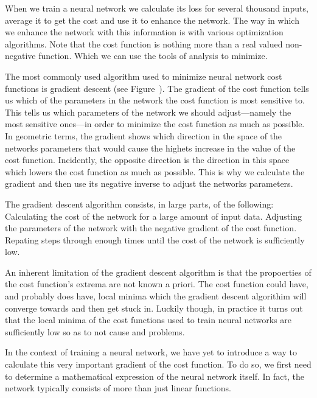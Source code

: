When we train a neural network we calculate its loss for several thousand inputs, average it to get the cost and use it to enhance the network.
The way in which we enhance the network with this information is with various optimization algorithms.
Note that the cost function is nothing more than a real valued non-negative function.
Which we can use the tools of analysis to minimize.

The most commonly used algorithm used to minimize neural network cost functions is gradient descent (see Figure~\in[gradient]).
The gradient of the cost function tells us which of the parameters in the network the cost function is most sensitive to.
This tells us which parameters of the network we should adjust---namely the most sensitive ones---in order to minimize the cost function as much as possible.
In geometric terms, the gradient shows which direction in the space of the networks parameters that would cause the highets increase in the value of the cost function.
Incidently, the opposite direction is the direction in this space which lowers the cost function as much as possible.
This is why we calculate the gradient and then use its negative inverse to adjust the networks parameters. 

The gradient descent algorithm consists, in large parts, of the following:
\startitemize[n]
\startitem[step1]
    Calculating the cost of the network for a large amount of input data.
\stopitem
\startitem[step2]
    Adjusting the parameters of the network with the negative gradient of the cost function.
\stopitem
\startitem
    Repating steps \in[step1] through \in[step2] enough times until the cost of the network is sufficiently low. 
\stopitem
\stopitemize

An inherent limitation of the gradient descent algorithm is that the propoerties of the cost function's extrema are not known a priori.
The cost function could have, and probably does have, local minima which the gradient descent algorithim will converge towards and then get stuck in.
Luckily though, in practice it turns out that the local minima of the cost functions used to train neural networks are sufficiently low so as to not cause and problems.

\startplacefigure[
    reference=gradient,
    location=bottom,
    title={Visualization of gradient descent \cite[s_2019].},
]
\stopplacefigure

In the context of training a neural network, we have yet to introduce a way to calculate this very important gradient of the cost function. 
To do so, we first need to determine a mathematical expression of the neural network itself.
In fact, the network typically consists of more than just linear functions.
